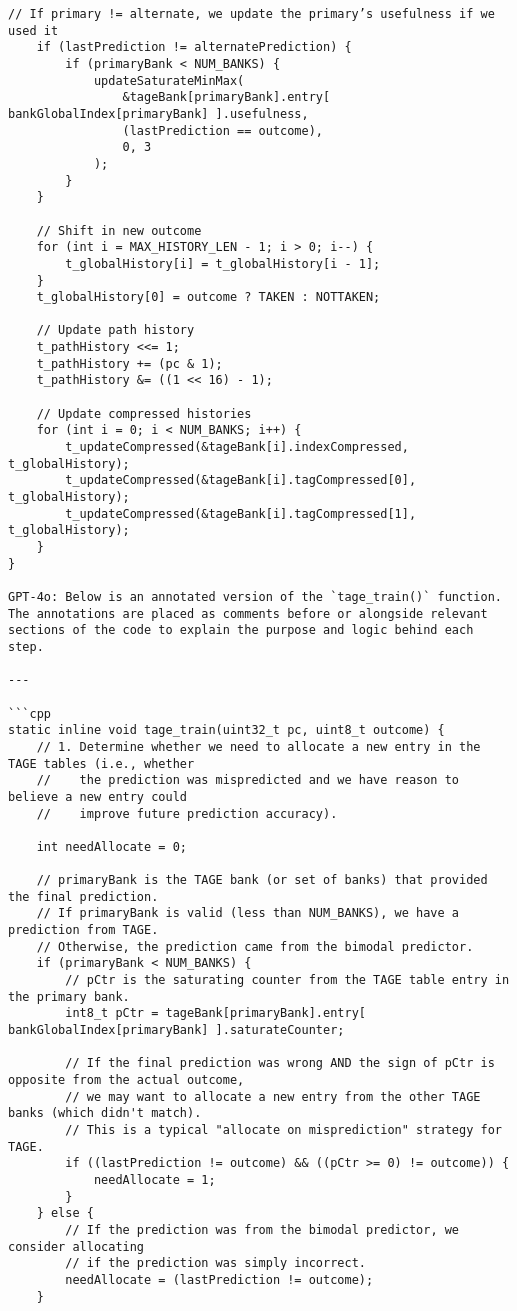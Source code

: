 \documentclass[11pt]{article}
\begin{document}
\begin{Verbatim}[fontsize=\tiny, breaklines=true]
    // If primary != alternate, we update the primary’s usefulness if we used it
    if (lastPrediction != alternatePrediction) {
        if (primaryBank < NUM_BANKS) {
            updateSaturateMinMax(
                &tageBank[primaryBank].entry[ bankGlobalIndex[primaryBank] ].usefulness,
                (lastPrediction == outcome),
                0, 3
            );
        }
    }

    // Shift in new outcome
    for (int i = MAX_HISTORY_LEN - 1; i > 0; i--) {
        t_globalHistory[i] = t_globalHistory[i - 1];
    }
    t_globalHistory[0] = outcome ? TAKEN : NOTTAKEN;

    // Update path history
    t_pathHistory <<= 1;
    t_pathHistory += (pc & 1);
    t_pathHistory &= ((1 << 16) - 1);

    // Update compressed histories
    for (int i = 0; i < NUM_BANKS; i++) {
        t_updateCompressed(&tageBank[i].indexCompressed, t_globalHistory);
        t_updateCompressed(&tageBank[i].tagCompressed[0], t_globalHistory);
        t_updateCompressed(&tageBank[i].tagCompressed[1], t_globalHistory);
    }
}

GPT-4o: Below is an annotated version of the `tage_train()` function. The annotations are placed as comments before or alongside relevant sections of the code to explain the purpose and logic behind each step.

---

```cpp
static inline void tage_train(uint32_t pc, uint8_t outcome) {
    // 1. Determine whether we need to allocate a new entry in the TAGE tables (i.e., whether
    //    the prediction was mispredicted and we have reason to believe a new entry could
    //    improve future prediction accuracy).

    int needAllocate = 0;

    // primaryBank is the TAGE bank (or set of banks) that provided the final prediction.
    // If primaryBank is valid (less than NUM_BANKS), we have a prediction from TAGE.
    // Otherwise, the prediction came from the bimodal predictor.
    if (primaryBank < NUM_BANKS) {
        // pCtr is the saturating counter from the TAGE table entry in the primary bank.
        int8_t pCtr = tageBank[primaryBank].entry[ bankGlobalIndex[primaryBank] ].saturateCounter;

        // If the final prediction was wrong AND the sign of pCtr is opposite from the actual outcome,
        // we may want to allocate a new entry from the other TAGE banks (which didn't match).
        // This is a typical "allocate on misprediction" strategy for TAGE.
        if ((lastPrediction != outcome) && ((pCtr >= 0) != outcome)) {
            needAllocate = 1;
        }
    } else {
        // If the prediction was from the bimodal predictor, we consider allocating
        // if the prediction was simply incorrect.
        needAllocate = (lastPrediction != outcome);
    }


\end{Verbatim}
\end{document}
